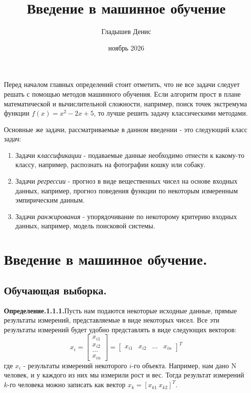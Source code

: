 \documentclass[a4paper,12pt]{article}
\title{Введение в машинное обучение}
\author{Гладышев Денис}
\date{ноябрь 2026}
\begin{document}
\maketitle
Перед началом главных определений стоит отметить, что не все задачи следует решать с помощью методов машинного обучения. Если алгоритм прост в плане математической и вычислительной сложности, например, поиск точек экстремума функции $f(x)=x^2-2x+5$, то лучше решить задачу классическими методами.

Основные же задачи, рассматриваемые в данном введении - это следующий класс задач:
\begin{enumerate}
    \item Задачи \textit{классификации} - подаваемые данные необходимо отнести к какому-то классу, например, распознать на фотографии кошку или собаку. 
    \item Задачи \textit{регрессии} - прогноз в виде вещественных чисел на основе входных данных, например, прогноз поведения функции по некоторым измеренным эмпирическим данным. 
    \item Задачи \textit{ранжирования} - упорядочивание по некоторому критерию входных данных, например, модель поисковой системы.
\end{enumerate}
\section{Введение в машинное обучение.}
\subsection{Обучающая выборка.}
\noindent\textbf{Определение.1.1.1.}Пусть нам подаются некоторые исходные данные, прямые результаты измерений, представляемые в виде некоторых чисел. Все эти результаты измерений будет удобно представлять в виде следующих векторов:
\begin{equation*}
    x_i = 
    \begin{bmatrix}
    x_{i1}\\
    x_{i2}\\
    ...\\
    x_{in}
    \end{bmatrix}
    =
    \begin{bmatrix}
        x_{i1} & x_{i2} & ... & x_{in}
    \end{bmatrix}
    ^T
\end{equation*}
где $x_i$ - результаты измерений некоторого $i$-го объекта. Например, нам дано N человек, и у каждого из них мы измерили рост и вес. Тогда результат измерений $k$-го человека можно записать как вектор $x_k=[x_{k1} \  x_{k2}]^T$.
\end{document}
